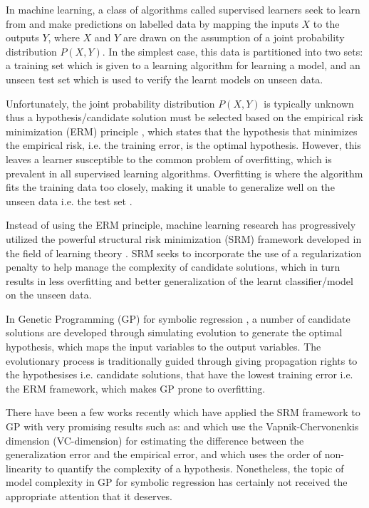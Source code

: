 \documentclass[conference]{IEEEtran}
\begin{document}
In machine learning, a class of algorithms called supervised learners seek to learn from and make predictions on labelled data by mapping the inputs $X$ to the outputs $Y$, where $X$ and $Y$ are drawn on the assumption of a joint probability distribution $P(X, Y)$. In the simplest case, this data is partitioned into two sets: a training set which is given to a learning algorithm for learning a model, and an unseen test set which is used to verify the learnt models on unseen data.

Unfortunately, the joint probability distribution $P(X, Y)$ is typically unknown thus a hypothesis/candidate solution must be selected based on the empirical risk minimization (ERM) principle \cite{b13}, which states that the hypothesis that minimizes the empirical risk, i.e. the training error, is the optimal hypothesis. However, this leaves a learner susceptible to the common problem of overfitting, which is prevalent in all supervised learning algorithms. Overfitting is where the algorithm fits the training data too closely, making it unable to generalize well on the unseen data i.e. the test set \cite{b1}.

Instead of using the ERM principle, machine learning research has progressively utilized the powerful structural risk minimization (SRM) framework developed in the field of learning theory \cite{b2}. SRM seeks to incorporate the use of a regularization penalty to help manage the complexity of candidate solutions, which in turn results in less overfitting and better generalization of the learnt classifier/model on the unseen data.

In Genetic Programming (GP) \cite{b3} for symbolic regression \cite{b4}, a number of candidate solutions are developed through simulating evolution to generate the optimal hypothesis, which maps the input variables to the output variables. The evolutionary process is traditionally guided through giving propagation rights to the hypothesises i.e. candidate solutions, that have the lowest training error i.e. the ERM framework, which makes GP prone to overfitting.

There have been a few works recently which have applied the SRM framework to GP with very promising results such as: \cite{b5} and \cite{b17} which use the Vapnik-Chervonenkis dimension (VC-dimension) for estimating the difference between the generalization error and the empirical error, and \cite{b6} which uses the order of non-linearity to quantify the complexity of a hypothesis. Nonetheless, the topic of model complexity in GP for symbolic regression has certainly not received the appropriate attention that it deserves. 
\end{document}
